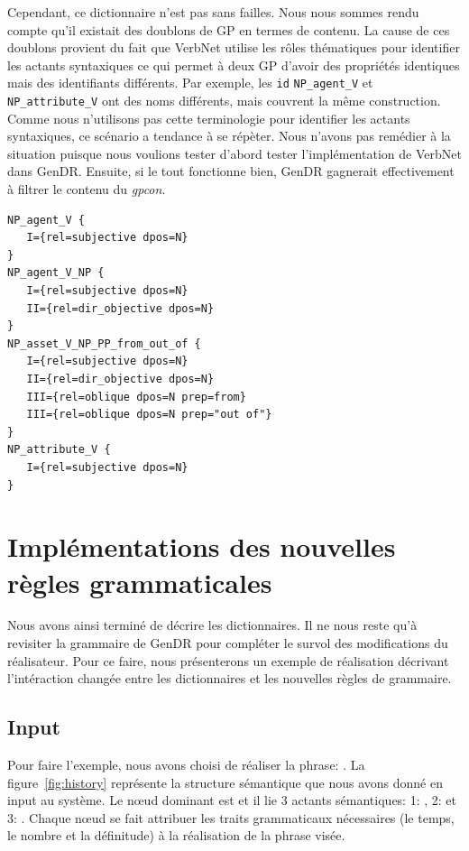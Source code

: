 Cependant, ce dictionnaire n'est pas sans failles. Nous nous sommes rendu compte qu'il existait des doublons de \ac{GP} en termes de contenu. La cause de ces doublons provient du fait que VerbNet utilise les rôles thématiques pour identifier les actants syntaxiques ce qui permet à deux \ac{GP} d'avoir des propriétés identiques mais des identifiants différents. Par exemple, les \texttt{id} \texttt{NP\_agent\_V} et \texttt{NP\_attribute\_V} ont des noms différents, mais couvrent la même construction. Comme nous n'utilisons pas cette terminologie pour identifier les actants syntaxiques,  ce scénario a tendance à se répèter. Nous n'avons pas remédier à la situation puisque nous voulions tester d'abord tester l'implémentation de VerbNet dans GenDR. Ensuite, si le tout fonctionne bien, GenDR gagnerait effectivement à filtrer le contenu du \emph{gpcon}.

\begin{minipage}{\linewidth}
\begin{lstlisting}[language=XML, caption = Gpcon]
NP_agent_V {
   I={rel=subjective dpos=N}
}
NP_agent_V_NP {
   I={rel=subjective dpos=N}
   II={rel=dir_objective dpos=N}
}
NP_asset_V_NP_PP_from_out_of {
   I={rel=subjective dpos=N}
   II={rel=dir_objective dpos=N}
   III={rel=oblique dpos=N prep=from}
   III={rel=oblique dpos=N prep="out of"}
}
NP_attribute_V {
   I={rel=subjective dpos=N}
}
\end{lstlisting}
\end{minipage}

\section{Implémentations des nouvelles règles grammaticales}
Nous avons ainsi terminé de décrire les dictionnaires. Il ne nous reste qu'à revisiter la grammaire de GenDR pour compléter le survol des modifications du réalisateur. Pour ce faire, nous présenterons un exemple de réalisation décrivant l'intéraction changée entre les dictionnaires et les nouvelles règles de grammaire. 

\subsection{Input}
Pour faire l'exemple, nous avons choisi de réaliser la phrase: . La figure~\ref{fig:history} représente la structure sémantique que nous avons donné en input au système. Le n\oe{}ud dominant est  et il lie 3 actants sémantiques: 1: , 2:  et 3: . Chaque n\oe{}ud se fait attribuer les traits grammaticaux nécessaires (le temps, le nombre et la définitude) à la réalisation de la phrase visée.

